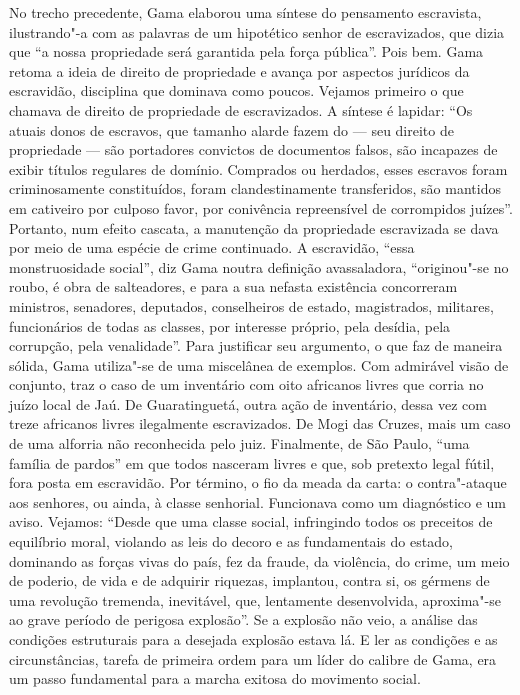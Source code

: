 {\small\noindent
No trecho precedente, Gama elaborou uma síntese do pensamento
escravista, ilustrando"-a com as palavras de um hipotético senhor de
escravizados, que dizia que ``a nossa propriedade será garantida pela
força pública''. Pois bem. Gama retoma a ideia de direito de propriedade
e avança por aspectos jurídicos da escravidão, disciplina que dominava
como poucos. Vejamos primeiro o que chamava de direito de propriedade de
escravizados. A síntese é lapidar: ``Os atuais donos de escravos, que
tamanho alarde fazem do --- seu direito de propriedade --- são portadores
convictos de documentos falsos, são incapazes de exibir títulos
regulares de domínio. Comprados ou herdados, esses escravos foram
criminosamente constituídos, foram clandestinamente transferidos, são
mantidos em cativeiro por culposo favor, por conivência repreensível de
corrompidos juízes''. Portanto, num efeito cascata, a manutenção da
propriedade escravizada se dava por meio de
uma espécie de crime continuado. A escravidão, ``essa monstruosidade
social'', diz Gama noutra definição avassaladora, ``originou"-se no roubo,
é obra de salteadores, e para a sua nefasta existência concorreram
ministros, senadores, deputados, conselheiros de estado, magistrados,
militares, funcionários de todas as classes, por interesse próprio, pela
desídia, pela corrupção, pela venalidade''. Para justificar seu
argumento, o que faz de maneira sólida, Gama utiliza"-se de uma
miscelânea de exemplos. Com admirável visão de conjunto, traz o caso de
um inventário com oito africanos livres que corria no juízo local de
Jaú. De Guaratinguetá, outra ação de inventário, dessa vez com treze
africanos livres ilegalmente escravizados. De Mogi das Cruzes, mais um
caso de uma alforria não reconhecida pelo juiz. Finalmente, de São
Paulo, ``uma família de pardos'' em que todos nasceram livres e que, sob
pretexto legal fútil, fora posta em escravidão. Por término, o fio da
meada da carta: o contra"-ataque aos senhores, ou ainda, à classe
senhorial. Funcionava como um diagnóstico e um aviso. Vejamos: ``Desde
que uma classe social, infringindo todos os preceitos de equilíbrio
moral, violando as leis do decoro e as fundamentais do estado, dominando
as forças vivas do país, fez da fraude, da violência, do crime, um meio
de poderio, de vida e de adquirir riquezas, implantou, contra si, os
gérmens de uma revolução tremenda, inevitável, que, lentamente
desenvolvida, aproxima"-se ao grave período de perigosa explosão''. Se a
explosão não veio, a análise das condições estruturais para a desejada
explosão estava lá. E ler as condições e as circunstâncias, tarefa de
primeira ordem para um líder do calibre de Gama, era um passo
fundamental para a marcha exitosa do movimento social.}

